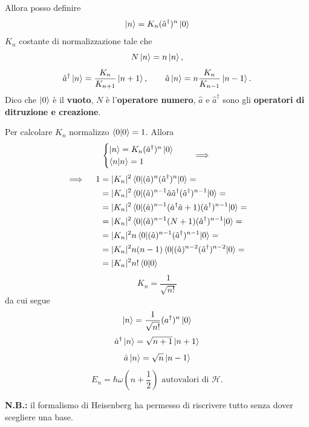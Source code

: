 \bigskip
\noindent
Allora posso definire
\[
\ket{n} = K_n (\hat{a}^\dag)^n \ket{0}
\]
\( K_n \) costante di normalizzazione tale che 
\[
N \ket{n} = n \ket{n},
\]
\[
\hat{a}^\dag \ket{n} = \frac{K_n}{K_{n + 1}} \ket{n + 1}, \qquad \hat{a} \ket{n} = n \frac{K_n}{K_{n - 1}}\ket{n - 1}.
\]
Dico che \( \ket{0} \) è il \textbf{vuoto}, \( N \) è l'\textbf{operatore numero}, \( \hat{a} \) e \( \hat{a}^\dag \) sono gli \textbf{operatori di ditruzione e creazione}.

\bigskip
\noindent
Per calcolare \( K_n \) normalizzo \( \braket{0|0} = 1 \). Allora
\[
\begin{cases}
\ket{n} = K_n (\hat{a}^\dag)^n \ket{0} \\
\braket{n|n} = 1
\end{cases} \quad \implies
\]
\begin{align*}
\implies \quad 1 &= |K_n|^2 \braket{0|(\hat{a})^n(\hat{a}^\dag)^n|0} = \\
&= |K_n|^2 \braket{0|(\hat{a})^{n - 1} \hat{a} \hat{a}^\dag (\hat{a}^\dag)^{n - 1}|0} = \\
&= |K_n|^2 \braket{0|(\hat{a})^{n - 1} (\hat{a}^\dag \hat{a} + 1) (\hat{a}^\dag)^{n - 1}|0} = \\
&= |K_n|^2 \braket{0|(\hat{a})^{n - 1} (N + 1) (\hat{a}^\dag)^{n - 1}|0} = \\
&= |K_n|^2 n \braket{0|(\hat{a})^{n - 1} (\hat{a}^\dag)^{n - 1}|0} = \\
&= |K_n|^2 n (n - 1) \braket{0|(\hat{a})^{n - 2} (\hat{a}^\dag)^{n - 2}|0} = \\
&= |K_n|^2 n! \braket{0|0}
\end{align*}
\[
\boxed{K_n = \frac{1}{\sqrt{n!}}} 
\]
da cui segue
\[
\ket{n} = \frac{1}{\sqrt{n!}} (a^\dag)^n \ket{0}
\]
\[
\hat{a}^\dag \ket{n} = \sqrt{n + 1} \ket{n + 1}
\]
\[
\hat{a} \ket{n} = \sqrt{n} \ket{n - 1}
\]
\[
E_n = \hbar \omega \left( n + \frac{1}{2} \right) \text{ autovalori di } \mathcal{H}.
\]

\bigskip
\noindent
\textbf{N.B.:} il formalismo di Heisenberg ha permesso di riscrivere tutto senza dover scegliere una base.

